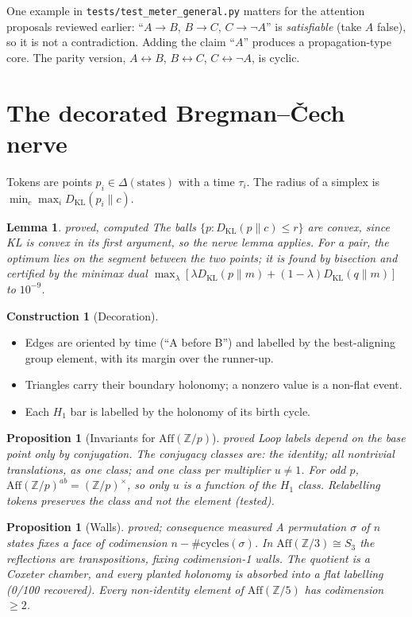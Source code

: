 \documentclass[11pt]{article}
\newtheorem{proposition}[theorem]{Proposition}
\newtheorem{lemma}[theorem]{Lemma}
\theoremstyle{definition}
\newtheorem{construction}[theorem]{Construction}
\theoremstyle{remark}
\newcommand{\Z}{\mathbb{Z}}
\newcommand{\KL}{D_{\mathrm{KL}}}
\newcommand{\Aff}{\mathrm{Aff}}
\newcommand{\st}[1]{\textsf{\small\color{gray}#1}}
\begin{document}
One example in \texttt{tests/test\_meter\_general.py} matters for the attention proposals reviewed earlier: ``$A\to B$, $B\to C$, $C\to\neg A$'' is \emph{satisfiable} (take $A$ false), so it is not a contradiction. Adding the claim ``$A$'' produces a propagation-type core. The parity version, $A\leftrightarrow B$, $B\leftrightarrow C$, $C\leftrightarrow\neg A$, is cyclic.


\section{The decorated Bregman--\v{C}ech nerve}
Tokens are points $p_i\in\Delta(\text{states})$ with a time $\tau_i$. The radius of a simplex is $\min_c\max_i\KL(p_i\|c)$.

\begin{lemma}\st{proved, computed}
The balls $\{p:\KL(p\|c)\le r\}$ are convex, since KL is convex in its first argument, so the nerve lemma applies. For a pair, the optimum lies on the segment between the two points; it is found by bisection and certified by the minimax dual $\max_\lambda[\lambda\KL(p\|m)+(1-\lambda)\KL(q\|m)]$ to $10^{-9}$.
\end{lemma}
\begin{construction}[Decoration]
\begin{itemize}
  \item Edges are oriented by time (``A before B'') and labelled by the best-aligning group element, with its margin over the runner-up.
  \item Triangles carry their boundary holonomy; a nonzero value is a non-flat event.
  \item Each $H_1$ bar is labelled by the holonomy of its birth cycle.
\end{itemize}
\end{construction}
\begin{proposition}[Invariants for $\Aff(\Z/p)$]\st{proved}
Loop labels depend on the base point only by conjugation. The conjugacy classes are: the identity; all nontrivial translations, as one class; and one class per multiplier $u\ne1$. For odd $p$, $\Aff(\Z/p)^{ab}=(\Z/p)^\times$, so only $u$ is a function of the $H_1$ class. Relabelling tokens preserves the class and not the element (tested).
\end{proposition}
\begin{proposition}[Walls]\label{prop:walls}\st{proved; consequence measured}
A permutation $\sigma$ of $n$ states fixes a face of codimension $n-\#\text{cycles}(\sigma)$. In $\Aff(\Z/3)\cong S_3$ the reflections are transpositions, fixing codimension-1 walls. The quotient is a Coxeter chamber, and every planted holonomy is absorbed into a flat labelling (0/100 recovered). Every non-identity element of $\Aff(\Z/5)$ has codimension $\ge2$.
\end{proposition}
\end{document}
